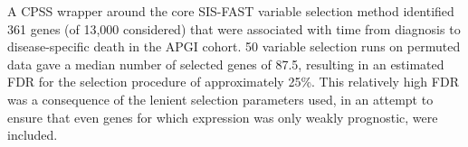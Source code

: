 \documentclass[dissertation.tex]{subfiles}
\begin{document}


A \gls{CPSS} wrapper around the core \gls{SIS}-\gls{FAST} variable selection method \cite{Gorst-Rasmussen2013} identified 361 genes (of 13,000 considered) that were associated with time from diagnosis to disease-specific death in the \gls{APGI} cohort.  50 variable selection runs on permuted data gave a median number of selected genes of 87.5, resulting in an estimated \gls{FDR} for the selection procedure of approximately 25\%.  This relatively high \gls{FDR} was a consequence of the lenient selection parameters used, in an attempt to ensure that even genes for which expression was only weakly prognostic, were included.
\end{document}
